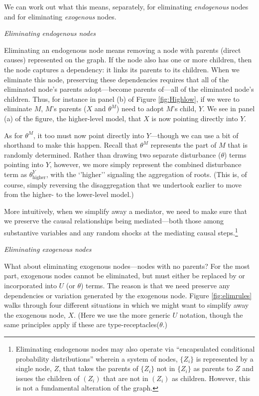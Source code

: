 \documentclass[
  12pt,
]{book}
\begin{document}
We can work out what this means, separately, for eliminating \emph{endogenous} nodes and for eliminating \emph{exogenous} nodes.

\emph{Eliminating endogenous nodes}

Eliminating an endogenous node means removing a node with parents (direct causes) represented on the graph. If the node also has one or more children, then the node captures a dependency: it links its parents to its children. When we eliminate this node, preserving these dependencies requires that all of the eliminated node's parents adopt---become parents of---all of the eliminated node's children. Thus, for instance in panel (b) of Figure \ref{fig:Highlow}, if we were to eliminate \(M\), \(M\)'s parents (\(X\) and \(\theta^M\)) need to adopt \(M\)'s child, \(Y\). We see in panel (a) of the figure, the higher-level model, that \(X\) is now pointing directly into \(Y\).

As for \(\theta^M\), it too must now point directly into \(Y\)---though we can use a bit of shorthand to make this happen. Recall that \(\theta^M\) represents the part of \(M\) that is randomly determined. Rather than drawing two separate disturbance (\(\theta\)) terms pointing into \(Y\), however, we more simply represent the combined disturbance term as \(\theta^Y_{\text{higher}}\), with the `'higher'' signaling the aggregation of roots. (This is, of course, simply reversing the disaggregation that we undertook earlier to move from the higher- to the lower-level model.)

More intuitively, when we simplify away a mediator, we need to make sure that we preserve the causal relationships being mediated---both those among substantive variables and any random shocks at the mediating causal steps.\footnote{Eliminating endogenous nodes may also operate via ``encapsulated conditional probability distributions'' \citep{koller2009probabilistic} wherein a system of nodes, \(\{Z_i\}\) is represented by a single node, \(Z\), that takes the parents of \(\{Z_i\}\) not in \(\{Z_i\}\) as parents to \(Z\) and issues the children of \((Z_i)\) that are not in \((Z_i)\) as children. However, this is not a fundamental alteration of the graph.}

\emph{Eliminating exogenous nodes}

What about eliminating exogenous nodes---nodes with no parents? For the most part, exogenous nodes cannot be eliminated, but must either be replaced by or incorporated into \(U\) (or \(\theta\)) terms. The reason is that we need preserve any dependencies or variation generated by the exogenous node. Figure \ref{fig:elimrules} walks through four different situations in which we might want to simplify away the exogenous node, \(X\). (Here we use the more generic \(U\) notation, though the same principles apply if these are type-receptacles(\(\theta\).)
\end{document}

